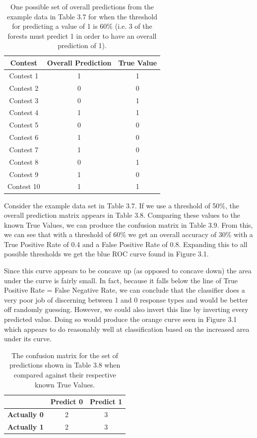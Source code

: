 \begin{table}
\begin{center}
\begin{tabular}{| c | c | c |}
\hline
 \textbf{Contest} & \textbf{Overall Prediction} & \textbf{True Value}\\ 
 \hline
 Contest 1 & 1 & 1 \\  
 \hline
 Contest 2 & 0 & 0 \\
 \hline
 Contest 3 & 0 & 1 \\
 \hline
 Contest 4 & 1 & 1 \\
 \hline
 Contest 5 & 0 & 0 \\
 \hline
 Contest 6 & 1 & 0 \\
 \hline
 Contest 7 & 1 & 0 \\
 \hline
 Contest 8 & 0 & 1 \\
 \hline
 Contest 9 & 1 & 0 \\
 \hline
 Contest 10 & 1 & 1 \\
 \hline
\end{tabular}
\caption{One possible set of overall predictions from the example data in Table 3.7 for when the threshold for predicting a value of 1 is 60\% (i.e. 3 of the forests must predict 1 in order to have an overall prediction of 1).}
\end{center}
\end{table}

Consider the example data set in Table 3.7. If we use a threshold of 50\%, the overall prediction matrix appears in Table 3.8. Comparing these values to the known True Values, we can produce the confusion matrix in Table 3.9. From this, we can see that with a threshold of 60\% we get an overall accuracy of 30\% with a True Positive Rate of 0.4 and a False Positive Rate of 0.8. Expanding this to all possible thresholds we get the blue ROC curve found in Figure 3.1.

Since this curve appears to be concave up (as opposed to concave down) the area under the curve is fairly small. In fact, because it falls below the line of True Positive Rate = False Negative Rate, we can conclude that the classifier does a very poor job of discerning between 1 and 0 response types and would be better off randomly guessing. However, we could also invert this line by inverting every predicted value. Doing so would produce the orange curve seen in Figure 3.1 which appears to do reasonably well at classification based on the increased area under its curve.

\begin{table}
\centering
\begin{tabular}{| c | c | c |}
\hline
 & \textbf{Predict 0} & \textbf{Predict 1}  \\ 
\hline
\textbf{Actually 0} & 2 & 3 \\ 
\hline
\textbf{Actually 1} & 2 & 3 \\
\hline
\end{tabular}
\caption{The confusion matrix for the set of predictions shown in Table 3.8 when compared against their respective known True Values.}
\end{table}


